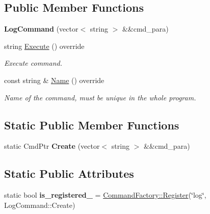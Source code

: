 \subsection*{Public Member Functions}
\begin{DoxyCompactItemize}
\item 
\mbox{\label{classwscmd_1_1LogCommand_a805597e0d733814ff3238bcb99c8041a}} 
{\bfseries Log\+Command} (vector$<$ string $>$ \&\&cmd\+\_\+para)
\item 
\mbox{\label{classwscmd_1_1LogCommand_a9ef233e03aa8736cd9578ba015161efb}} 
string \hyperlink{classwscmd_1_1LogCommand_a9ef233e03aa8736cd9578ba015161efb}{Execute} () override
\begin{DoxyCompactList}\small\item\em Execute command. \end{DoxyCompactList}\item 
const string \& \hyperlink{classwscmd_1_1LogCommand_a465f14b51110d3f0a7d5fe873bafd857}{Name} () override
\begin{DoxyCompactList}\small\item\em Name of the command, must be unique in the whole program. \end{DoxyCompactList}\end{DoxyCompactItemize}
\subsection*{Static Public Member Functions}
\begin{DoxyCompactItemize}
\item 
\mbox{\label{classwscmd_1_1LogCommand_a027391b953d2e1aa9a7655b058639f80}} 
static Cmd\+Ptr {\bfseries Create} (vector$<$ string $>$ \&\&cmd\+\_\+para)
\end{DoxyCompactItemize}
\subsection*{Static Public Attributes}
\begin{DoxyCompactItemize}
\item 
\mbox{\label{classwscmd_1_1LogCommand_a6f599e38cd04f3c29b2b4e9f9ada8ce4}} 
static bool {\bfseries is\+\_\+registered\+\_\+} = \hyperlink{classwscmd_1_1CommandFactory_a3d750b11a80519e15f7e2efbc1f60528}{Command\+Factory\+::\+Register}(\char`\"{}log\char`\"{}, Log\+Command\+::\+Create)
\end{DoxyCompactItemize}
